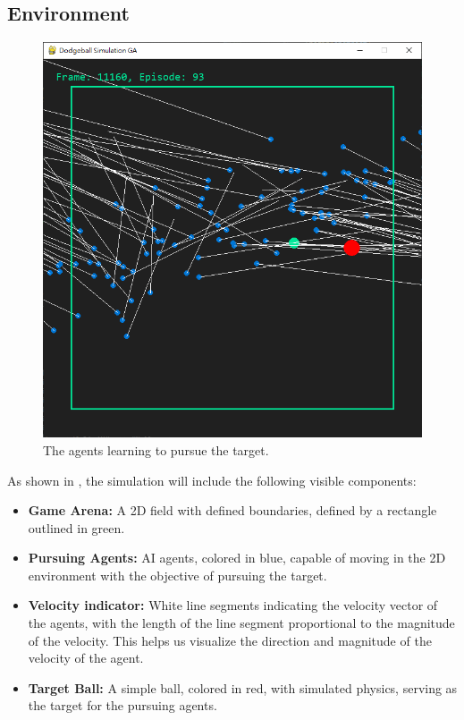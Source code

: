 \documentclass[sigconf]{acmart}
\begin{document}
\subsection{Environment}
\begin{figure}[H]
  \centering
  \includegraphics[width=0.95\linewidth]{imgs/demo01.png}
  \caption{The agents learning to pursue the target.}
  \label{fig:ball_demo}
\end{figure}
As shown in , the simulation will include the following visible components:
\begin{itemize}
  \item \textbf{Game Arena:} A 2D field with defined boundaries, defined by a rectangle outlined in green.
  \item \textbf{Pursuing Agents:} AI agents, colored in blue, capable of moving in the 2D environment with the objective of pursuing the target.
  \item \textbf{Velocity indicator:} White line segments indicating the velocity vector of the agents, with the length of the line segment proportional to the magnitude of the velocity. This helps us visualize the direction and magnitude of the velocity of the agent.
  \item \textbf{Target Ball:} A simple ball, colored in red, with simulated physics, serving as the target for the pursuing agents.
\end{itemize}
\end{document}
